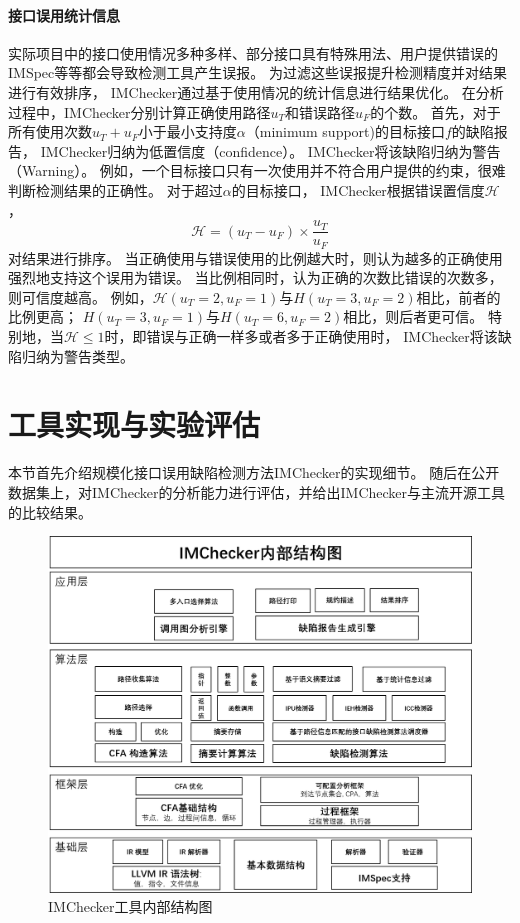 \paragraph{接口误用统计信息}
实际项目中的接口使用情况多种多样、部分接口具有特殊用法、用户提供错误的IMSpec等等都会导致检测工具产生误报。
为过滤这些误报提升检测精度并对结果进行有效排序，
IMChecker通过基于使用情况的统计信息进行结果优化。
在分析过程中，IMChecker分别计算正确使用路径$u_T$和错误路径$u_F$的个数。
首先，对于所有使用次数$u_T+u_F$小于最小支持度$\alpha$（minimum support)的目标接口$f$的缺陷报告，
IMChecker归纳为低置信度（confidence）。
IMChecker将该缺陷归纳为警告（Warning）。
例如，一个目标接口只有一次使用并不符合用户提供的约束，很难判断检测结果的正确性。
对于超过$\alpha$的目标接口，
IMChecker根据错误置信度$\mathcal{H}$，
$$\mathcal{H}  = ({u_T-u_F})\times\dfrac{u_T}{u_F}$$
对结果进行排序。
当正确使用与错误使用的比例越大时，则认为越多的正确使用强烈地支持这个误用为错误。
当比例相同时，认为正确的次数比错误的次数多，则可信度越高。
例如，$\mathcal{H}(u_T=2, u_F=1)$与$H(u_T=3, u_F=2)$相比，前者的比例更高；
$H(u_T=3, u_F=1)$与$H(u_T=6, u_F=2)$相比，则后者更可信。
特别地，当$\mathcal{H} \le 1$时，即错误与正确一样多或者多于正确使用时，
IMChecker将该缺陷归纳为警告类型。

\section{工具实现与实验评估}
\label{sec:3.4}
本节首先介绍规模化接口误用缺陷检测方法IMChecker的实现细节。
随后在公开数据集上，对IMChecker的分析能力进行评估，并给出IMChecker与主流开源工具的比较结果。

\begin{figure}[t]
	\centering
	\includegraphics[width=0.9\linewidth]{figures/cp3-implementation.png}
	\caption{
		IMChecker工具内部结构图
	}
	\label{fig:3-4-implementation}
\end{figure}

